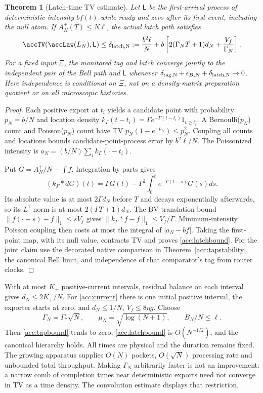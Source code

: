 \documentclass[11pt,oneside,openany]{book}
\newtheorem{theorem}{Theorem}[chapter]
\theoremstyle{definition}
\theoremstyle{remark}\newtheorem{remark}[theorem]{Remark}
\begin{document}
\begin{theorem}[Latch-time TV estimate]\label{acc:latchtimes}
Let $\mathsf L$ be the first-arrival process of deterministic intensity
$bf(t)$ while ready and zero after its first event, including the null atom.
If $A_N^+(T)\le N\ell$, the actual latch path satisfies
\begin{equation}
 \accTV(\accLaw(L_N),\mathsf L)\le
 \delta_{\rm latch,N}:=\frac{b^2\ell}{N}
 +b\left[2(\Gamma_NT+1)d_N+\frac{V_f}{\Gamma_N}\right].
 \label{acc:latchbound}
\end{equation}
For a fixed input $\Xi$, the monitored tag and latch converge jointly to
the independent pair of the Bell path and $\mathsf L$ whenever
$\delta_{\rm tag,N}+\epsilon_{B,N}+\delta_{\rm latch,N}\to0$.
Here independence is conditional on $\Xi$, not on a density-matrix
preparation quotient or on all microscopic histories.
\end{theorem}
\begin{proof}
Each positive export at $t_i$ yields a candidate point with probability
$p_N=b/N$ and location density
$k_\Gamma(t-t_i)=\Gamma e^{-\Gamma(t-t_i)}1_{t\ge t_i}$.
A Bernoulli($p_N$) count and Poisson($p_N$) count have TV
$p_N(1-e^{-p_N})\le p_N^2$. Coupling all counts and locations bounds
candidate-point-process error by $b^2\ell/N$. The Poissonized intensity is
$a_N=(b/N)\sum_i k_\Gamma(\cdot-t_i)$.

Put $G=A_N^+/N-\int f$. Integration by parts gives
\[
 (k_\Gamma*dG)(t)=\Gamma G(t)
 -\Gamma^2\int_0^te^{-\Gamma(t-s)}G(s)ds.
\]
Its absolute value is at most $2\Gamma d_N$ before $T$ and decays
exponentially afterwards, so its $L^1$ norm is at most
$2(\Gamma T+1)d_N$. The BV translation bound
$\|f(\cdot-s)-f\|_1\le sV_f$ gives
$\|k_\Gamma*f-f\|_1\le V_f/\Gamma$.
Minimum-intensity Poisson coupling then costs at most the integral of
$|a_N-bf|$. Taking the first-point map, with its null value, contracts TV
and proves \eqref{acc:latchbound}. For the joint claim use the decorated
native comparison in Theorem~\ref{acc:tapstability}, the canonical Bell
limit, and independence of that comparator's tag from router clocks.
\end{proof}

With at most $K_+$ positive-current intervals, residual balance on each
interval gives $d_N\le2K_+/N$. For \eqref{acc:current} there is one initial
positive interval, the exporter starts at zero, and $d_N\le1/N$,
$V_f\le8\eta g$. Choose
\begin{equation}
 \Gamma_N=\Gamma_*\sqrt N,\qquad
 \mu_N=\sqrt{\log(N+1)},\qquad B_N/N\le\ell.
 \label{acc:simultaneous}
\end{equation}
Then \eqref{acc:tapbound} tends to zero, \eqref{acc:latchbound} is
$O(N^{-1/2})$, and the canonical hierarchy holds. All times are physical
and the duration remains fixed. The growing apparatus supplies $O(N)$
pockets, $O(\sqrt N)$ processing rate and unbounded total throughput.
Making $\Gamma_N$ arbitrarily faster is not an improvement: a narrow comb
of completion times near deterministic exports need not converge in TV
as a time density. The convolution estimate displays that restriction.
\end{document}
